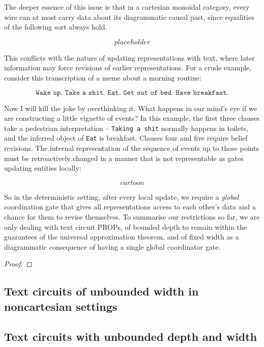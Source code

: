 \begin{fullwidth}
\begin{example}
\end{example}

The deeper essence of this issue is that in a cartesian monoidal category, every wire can at most carry data about its diagrammatic causal past, since equalities of the following sort always hold.

\[placeholder\]

This conflicts with the nature of updating representations with text, where later information may force revisions of earlier representations. For a crude example, consider this transcription of a meme about a morning routine:

\[\texttt{Wake up. Take a shit. Eat. Get out of bed. Have breakfast.}\]

Now I will kill the joke by overthinking it. What happens in our mind's eye if we are constructing a little vignette of events? In this example, the first three clauses take a pedestrian interpretation -- \texttt{Taking a shit} normally happens in toilets, and the inferred object of \texttt{Eat} is breakfast. Clauses four and five require belief revisions. The internal representation of the sequence of events up to those points must be retroactively changed in a manner that is not representable as gates updating entities locally:

\[cartoon\]

So in the deterministic setting, after every local update, we require a \emph{global} coordination gate that gives all representations access to each other's data and a chance for them to revise themselves. To summarise our restrictions so far, we are only dealing with text circuit PROPs, of bounded depth to remain within the guarantees of the universal approximation theorem, and of fixed width as a diagrammatic consequence of having a single global coordinator gate.

\begin{theorem}
\begin{proof}

\end{proof}
\end{theorem}

\subsection{Text circuits of unbounded width in noncartesian settings}

\subsection{Text circuits with unbounded depth and width}


\end{fullwidth}
